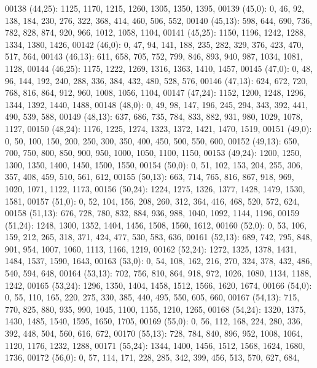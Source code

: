 \begin{DoxyCode}
00138       (44,25): 1125, 1170, 1215, 1260, 1305, 1350, 1395,
00139       (45,0): 0, 46, 92, 138, 184, 230, 276, 322, 368, 414, 460, 506, 552,
00140       (45,13): 598, 644, 690, 736, 782, 828, 874, 920, 966, 1012, 1058, 1104,
00141       (45,25): 1150, 1196, 1242, 1288, 1334, 1380, 1426,
00142       (46,0): 0, 47, 94, 141, 188, 235, 282, 329, 376, 423, 470, 517, 564,
00143       (46,13): 611, 658, 705, 752, 799, 846, 893, 940, 987, 1034, 1081, 1128,
00144       (46,25): 1175, 1222, 1269, 1316, 1363, 1410, 1457,
00145       (47,0): 0, 48, 96, 144, 192, 240, 288, 336, 384, 432, 480, 528, 576,
00146       (47,13): 624, 672, 720, 768, 816, 864, 912, 960, 1008, 1056, 1104,
00147       (47,24): 1152, 1200, 1248, 1296, 1344, 1392, 1440, 1488,
00148       (48,0): 0, 49, 98, 147, 196, 245, 294, 343, 392, 441, 490, 539, 588,
00149       (48,13): 637, 686, 735, 784, 833, 882, 931, 980, 1029, 1078, 1127,
00150       (48,24): 1176, 1225, 1274, 1323, 1372, 1421, 1470, 1519,
00151       (49,0): 0, 50, 100, 150, 200, 250, 300, 350, 400, 450, 500, 550, 600,
00152       (49,13): 650, 700, 750, 800, 850, 900, 950, 1000, 1050, 1100, 1150,
00153       (49,24): 1200, 1250, 1300, 1350, 1400, 1450, 1500, 1550,
00154       (50,0): 0, 51, 102, 153, 204, 255, 306, 357, 408, 459, 510, 561, 612,
00155       (50,13): 663, 714, 765, 816, 867, 918, 969, 1020, 1071, 1122, 1173,
00156       (50,24): 1224, 1275, 1326, 1377, 1428, 1479, 1530, 1581,
00157       (51,0): 0, 52, 104, 156, 208, 260, 312, 364, 416, 468, 520, 572, 624,
00158       (51,13): 676, 728, 780, 832, 884, 936, 988, 1040, 1092, 1144, 1196,
00159       (51,24): 1248, 1300, 1352, 1404, 1456, 1508, 1560, 1612,
00160       (52,0): 0, 53, 106, 159, 212, 265, 318, 371, 424, 477, 530, 583, 636,
00161       (52,13): 689, 742, 795, 848, 901, 954, 1007, 1060, 1113, 1166, 1219,
00162       (52,24): 1272, 1325, 1378, 1431, 1484, 1537, 1590, 1643,
00163       (53,0): 0, 54, 108, 162, 216, 270, 324, 378, 432, 486, 540, 594, 648,
00164       (53,13): 702, 756, 810, 864, 918, 972, 1026, 1080, 1134, 1188, 1242,
00165       (53,24): 1296, 1350, 1404, 1458, 1512, 1566, 1620, 1674,
00166       (54,0): 0, 55, 110, 165, 220, 275, 330, 385, 440, 495, 550, 605, 660,
00167       (54,13): 715, 770, 825, 880, 935, 990, 1045, 1100, 1155, 1210, 1265,
00168       (54,24): 1320, 1375, 1430, 1485, 1540, 1595, 1650, 1705,
00169       (55,0): 0, 56, 112, 168, 224, 280, 336, 392, 448, 504, 560, 616, 672,
00170       (55,13): 728, 784, 840, 896, 952, 1008, 1064, 1120, 1176, 1232, 1288,
00171       (55,24): 1344, 1400, 1456, 1512, 1568, 1624, 1680, 1736,
00172       (56,0): 0, 57, 114, 171, 228, 285, 342, 399, 456, 513, 570, 627, 684,

\end{DoxyCode}
